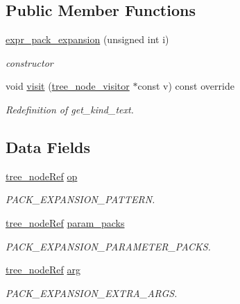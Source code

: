 \subsection*{Public Member Functions}
\begin{DoxyCompactItemize}
\item 
\hyperlink{structexpr__pack__expansion_a068177e0ca9c157c30765e9f72e767fe}{expr\+\_\+pack\+\_\+expansion} (unsigned int i)
\begin{DoxyCompactList}\small\item\em constructor \end{DoxyCompactList}\item 
void \hyperlink{structexpr__pack__expansion_aeebf07512e982ce8b1fb21276362c6d4}{visit} (\hyperlink{classtree__node__visitor}{tree\+\_\+node\+\_\+visitor} $\ast$const v) const override
\begin{DoxyCompactList}\small\item\em Redefinition of get\+\_\+kind\+\_\+text. \end{DoxyCompactList}\end{DoxyCompactItemize}
\subsection*{Data Fields}
\begin{DoxyCompactItemize}
\item 
\hyperlink{tree__node_8hpp_a6ee377554d1c4871ad66a337eaa67fd5}{tree\+\_\+node\+Ref} \hyperlink{structexpr__pack__expansion_ae8b4fd836f68167feda8e4b2398989cf}{op}
\begin{DoxyCompactList}\small\item\em P\+A\+C\+K\+\_\+\+E\+X\+P\+A\+N\+S\+I\+O\+N\+\_\+\+P\+A\+T\+T\+E\+RN. \end{DoxyCompactList}\item 
\hyperlink{tree__node_8hpp_a6ee377554d1c4871ad66a337eaa67fd5}{tree\+\_\+node\+Ref} \hyperlink{structexpr__pack__expansion_a0a204ae2e8f72e9c3c7396df81433f9f}{param\+\_\+packs}
\begin{DoxyCompactList}\small\item\em P\+A\+C\+K\+\_\+\+E\+X\+P\+A\+N\+S\+I\+O\+N\+\_\+\+P\+A\+R\+A\+M\+E\+T\+E\+R\+\_\+\+P\+A\+C\+KS. \end{DoxyCompactList}\item 
\hyperlink{tree__node_8hpp_a6ee377554d1c4871ad66a337eaa67fd5}{tree\+\_\+node\+Ref} \hyperlink{structexpr__pack__expansion_ac024d9af3a37176f8ea79cd114e5e629}{arg}
\begin{DoxyCompactList}\small\item\em P\+A\+C\+K\+\_\+\+E\+X\+P\+A\+N\+S\+I\+O\+N\+\_\+\+E\+X\+T\+R\+A\+\_\+\+A\+R\+GS. \end{DoxyCompactList}\end{DoxyCompactItemize}
